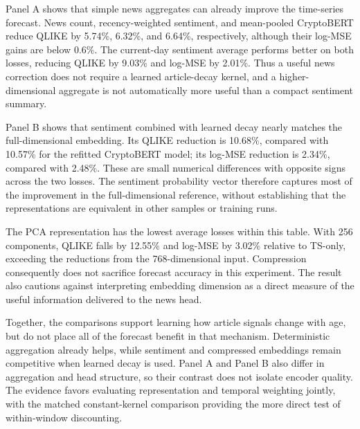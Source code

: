 Panel A shows that simple news aggregates can already improve the
time-series forecast. News count, recency-weighted sentiment, and
mean-pooled CryptoBERT reduce QLIKE by 5.74\%, 6.32\%, and 6.64\%,
respectively, although their log-MSE gains are below 0.6\%.
The current-day sentiment average performs better on both losses,
reducing QLIKE by 9.03\% and log-MSE by 2.01\%. Thus a useful
news correction does not require a learned article-decay kernel,
and a higher-dimensional aggregate is not automatically more useful
than a compact sentiment summary.

Panel B shows that sentiment combined with learned decay nearly
matches the full-dimensional embedding. Its QLIKE reduction is
10.68\%, compared with 10.57\% for the refitted CryptoBERT model;
its log-MSE reduction is 2.34\%, compared with 2.48\%.
These are small numerical differences with opposite signs across
the two losses. The sentiment probability vector therefore captures
most of the improvement in the full-dimensional reference, without
establishing that the representations are equivalent in other
samples or training runs.

The PCA representation has the lowest average losses within this
table. With 256 components, QLIKE falls by 12.55\% and log-MSE
by 3.02\% relative to TS-only, exceeding the reductions from the
768-dimensional input. Compression consequently does not sacrifice
forecast accuracy in this experiment. The result also cautions
against interpreting embedding dimension as a direct measure of
the useful information delivered to the news head.

Together, the comparisons support learning how article signals
change with age, but do not place all of the forecast benefit in
that mechanism. Deterministic aggregation already helps, while
sentiment and compressed embeddings remain competitive when learned
decay is used. Panel A and Panel B also differ in aggregation and
head structure, so their contrast does not isolate encoder quality.
The evidence favors evaluating representation and temporal weighting
jointly, with the matched constant-kernel comparison providing the
more direct test of within-window discounting.
